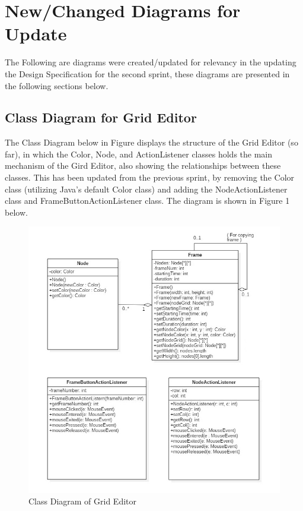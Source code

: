 \documentclass[12pt]{article}
\begin{document}
		\newpage
		
		\section{New/Changed Diagrams for Update}
		\forceindent The Following are diagrams were created/updated for relevancy in the updating the Design Specification for the second sprint, these diagrams are presented in the following sections below.
	
			\subsection {Class Diagram for Grid Editor}
				\forceindent The Class Diagram below in Figure displays the structure of the Grid Editor (so far), in which the Color, Node, and ActionListener classes holds the main mechanism of the Gird Editor, also showing the relationships between these classes. This has been updated from the previous sprint, by removing the Color class (utilizing Java's default Color class) and adding the NodeActionListener class and FrameButtonActionListener class. The diagram is shown in Figure 1 below.
				
				\begin{figure}[ht!]
					\centering
					\includegraphics[width=120mm]{Class_Diagram_Frame_Node_and_ActionListener_Classes.JPG}
					\caption{Class Diagram of Grid Editor \label{overflow}}
				\end{figure}
			
\end{document}
